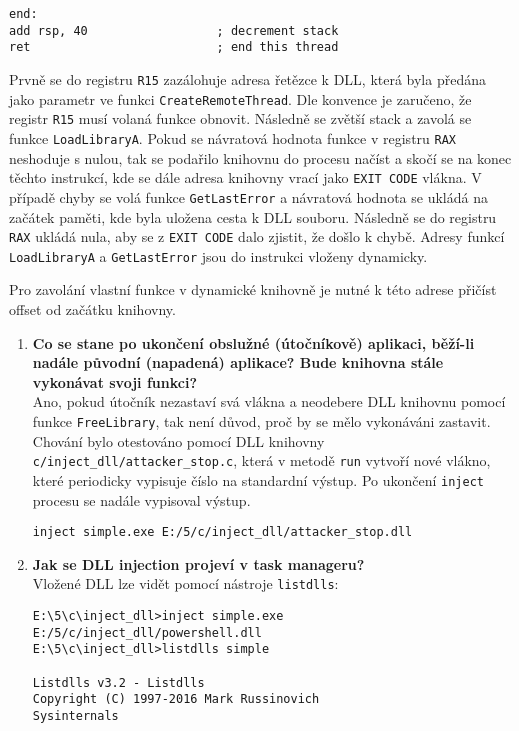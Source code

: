 \documentclass[12pt,a4paper]{article}
\begin{document}
\begin{enumerate}
\begin{verbatim}
end:
add rsp, 40                  ; decrement stack
ret                          ; end this thread
	\end{verbatim}
	Prvně se do registru \texttt{R15} zazálohuje adresa řetězce k DLL, která byla předána jako parametr ve funkci \texttt{CreateRemoteThread}.
	Dle konvence je zaručeno, že registr \texttt{R15} musí volaná funkce obnovit.
	Následně se zvětší stack a zavolá se funkce \texttt{LoadLibraryA}.
	Pokud se návratová hodnota funkce v registru \texttt{RAX} neshoduje s nulou, tak se podařilo knihovnu do procesu načíst a skočí se na konec těchto instrukcí, kde se dále adresa knihovny vrací jako \texttt{EXIT CODE} vlákna.
	V případě chyby se volá funkce \texttt{GetLastError} a návratová hodnota se ukládá na začátek paměti, kde byla uložena cesta k DLL souboru.
	Následně se do registru \texttt{RAX} ukládá nula, aby se z \texttt{EXIT CODE} dalo zjistit, že došlo k chybě.
	Adresy funkcí \texttt{LoadLibraryA} a \texttt{GetLastError} jsou do instrukci vloženy dynamicky.
	
	
	Pro zavolání vlastní funkce v dynamické knihovně je nutné k této adrese přičíst offset od začátku knihovny.
	
	
	\begin{enumerate}
	\item \textbf{Co se stane po ukončení obslužné (útočníkově) aplikaci, běží-li nadále původní (napadená) aplikace? Bude knihovna stále vykonávat svoji funkci?} \\
	
	Ano, pokud útočník nezastaví svá vlákna a neodebere DLL knihovnu pomocí funkce \texttt{FreeLibrary}, tak není důvod, proč by se mělo vykonáváni zastavit.
Chování bylo otestováno pomocí DLL knihovny \texttt{c/inject\_dll/attacker\_stop.c}, která v metodě \texttt{run} vytvoří nové vlákno, které periodicky vypisuje číslo na standardní výstup.
Po ukončení \texttt{inject} procesu se nadále vypisoval výstup.
\begin{verbatim}
inject simple.exe E:/5/c/inject_dll/attacker_stop.dll
\end{verbatim}


\item \textbf{Jak se DLL injection projeví v task manageru?} \\
Vložené DLL lze vidět pomocí nástroje \texttt{listdlls}:
\begin{verbatim}
E:\5\c\inject_dll>inject simple.exe E:/5/c/inject_dll/powershell.dll
E:\5\c\inject_dll>listdlls simple

Listdlls v3.2 - Listdlls
Copyright (C) 1997-2016 Mark Russinovich
Sysinternals


\end{verbatim}
\end{enumerate}
\end{enumerate}
\end{document}
